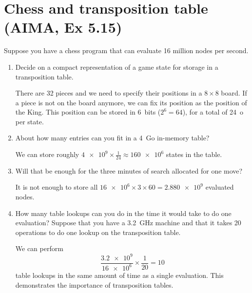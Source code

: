 \documentclass[11pt, a4paper]{article}
\begin{document}
\section{Chess and transposition table (AIMA, Ex 5.15)}

Suppose you have a chess program that can evaluate 16 million nodes per second.

\begin{enumerate}
    \item Decide on a compact representation of a game state for storage in a transposition table.

    \begin{solution}
        There are 32 pieces and we need to specify their positions in a $8 \times 8$ board. If a piece is not on the board anymore, we can fix its position as the position of the King. This position can be stored in \SI{6}{bits} ($2^6 = 64$), for a total of \SI{24}{o} per state.
    \end{solution}
    
    \item About how many entries can you fit in a \SI{4}{\giga o} in-memory table?
    
    \begin{solution}
        We can store roughly $\num{4e9} \times \frac{1}{24} \approx \num{160e6}$ states in the table.
    \end{solution}
    
    \item Will that be enough for the three minutes of search allocated for one move?
    
    \begin{solution}
        It is not enough to store all $\num{16e6} \times 3 \times 60 = \num{2.880e9}$ evaluated nodes.
    \end{solution}
    
    \item How many table lookups can you do in the time it would take to do one evaluation? Suppose that you have a \SI{3.2}{\giga\hertz} machine and that it takes 20 operations to do one lookup on the transposition table.
    
    \begin{solution}
        We can perform
        \begin{equation*}
            \frac{\num{3.2e9}}{\num{16e6}} \times \frac{1}{20} = 10
        \end{equation*}
        table lookups in the same amount of time as a single evaluation. This demonstrates the importance of transposition tables.
    \end{solution}
\end{enumerate}
\end{document}
